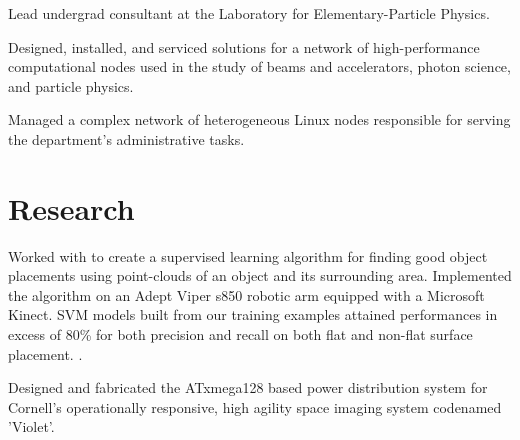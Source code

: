 \documentclass[]{deedy-resume-openfont}
\begin{document}
\begin{minipage}[t]{0.66\textwidth}
        \begin{tightemize}
            \item Lead undergrad consultant at the Laboratory for
                  Elementary-Particle Physics.
            \item Designed, installed, and serviced solutions for a network of
                  high-performance computational nodes used in the study of
                  beams and accelerators, photon science, and particle physics.
            \item Managed a complex network of heterogeneous Linux nodes
                  responsible for serving the department’s administrative
                  tasks.
        \end{tightemize}
    \sectionsep

    \section{Research}
            Worked with  to create a supervised learning algorithm
            for finding good object placements using point-clouds of an object
            and its surrounding area. Implemented the algorithm on an Adept
            Viper s850 robotic arm equipped with a Microsoft Kinect. SVM models
            built from our training examples attained performances in excess of
            80\% for both precision and recall on both flat and non-flat
            surface placement.
            .
        \sectionsep

            Designed and fabricated the ATxmega128 based power distribution
            system for Cornell’s operationally responsive, high agility space
            imaging system codenamed 'Violet'.
    \sectionsep


\end{minipage}
\end{document}
